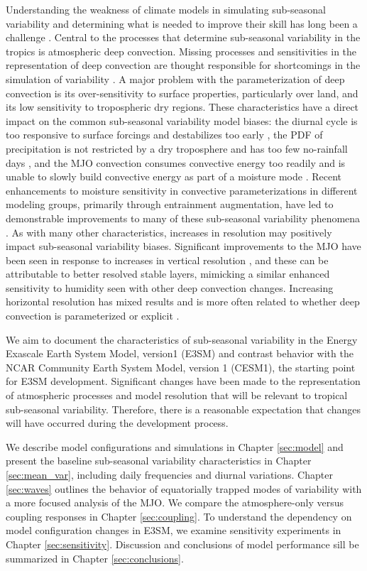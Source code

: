 \documentclass[draft,ms]{AGUTeX}
\begin{document}
\begin{article}
Understanding the weakness of climate models in simulating sub-seasonal variability and determining what is needed to improve their skill has long been a challenge \citep{Zhang2013}. Central to the processes that determine sub-seasonal variability in the tropics is atmospheric deep convection. Missing processes and sensitivities in the representation of deep convection are thought responsible for shortcomings in the simulation of variability \citep{Kim2014}. A major problem with the parameterization of deep convection is its over-sensitivity to surface properties, particularly over land, and its low sensitivity to tropospheric dry regions. These characteristics have a direct impact on the common sub-seasonal variability model biases: the diurnal cycle is too responsive to surface forcings and destabilizes too early \citep{Yuan2013}, the PDF of precipitation is not restricted by a dry troposphere and has too few no-rainfall days \citep{Hirota2014}, and the MJO convection consumes convective energy too readily and is unable to slowly build convective energy as part of a moisture mode \citep{Kim2014}. Recent enhancements to moisture sensitivity in convective parameterizations in different modeling groups, primarily through entrainment augmentation, have led to demonstrable improvements to many of these sub-seasonal variability phenomena \citep[e.g.,][]{Neale2008,Zhou2012,Tokioka1988,Oueslati2013}. As with many other characteristics, increases in resolution may positively impact sub-seasonal variability biases. Significant improvements to the MJO have been seen in response to increases in vertical resolution \citep{Inness2001a}, and these can be attributable to better resolved stable layers, mimicking a similar enhanced sensitivity to humidity seen with other deep convection changes. Increasing horizontal resolution has mixed results \citep[e.g.,][]{Jia2008} and is more often related to whether deep convection is parameterized or explicit \citep{Holloway2013}.

We aim to document the characteristics of sub-seasonal variability in the Energy Exascale Earth System Model, version1 (E3SM) and contrast behavior with the NCAR Community Earth System Model, version 1 (CESM1), the starting point for E3SM development. Significant changes have been made to the representation of atmospheric processes and model resolution that will be relevant to tropical sub-seasonal variability. Therefore, there is a reasonable expectation that changes will have occurred during the development process.

We describe model configurations and simulations in Chapter \ref{sec:model} and present the baseline sub-seasonal variability characteristics in Chapter \ref{sec:mean_var}, including daily frequencies and diurnal variations. Chapter \ref{sec:waves} outlines the behavior of equatorially trapped modes of variability with a more focused analysis of the MJO. We compare the atmosphere-only versus coupling responses in Chapter \ref{sec:coupling}. To understand the dependency on model configuration changes in E3SM, we examine sensitivity experiments in Chapter \ref{sec:sensitivity}. Discussion and conclusions of model performance sill be summarized in Chapter \ref{sec:conclusions}.




\end{article}
\end{document}
